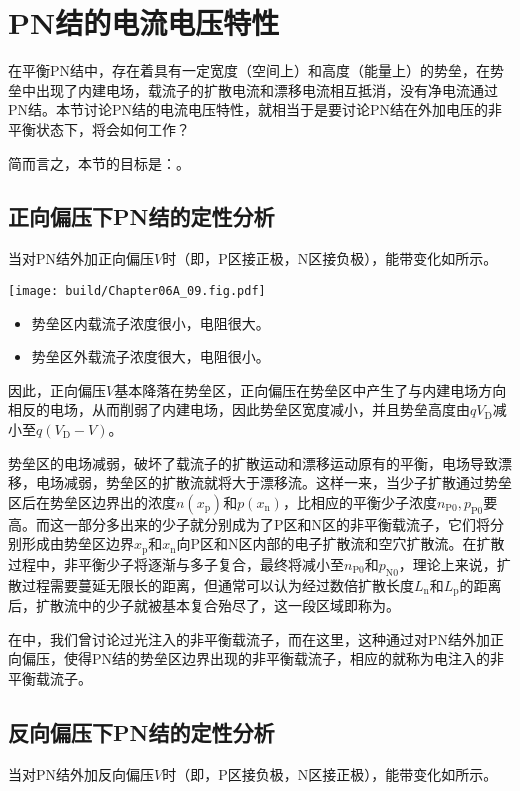 \section{PN结的电流电压特性}
在平衡PN结中，存在着具有一定宽度（空间上）和高度（能量上）的势垒，在势垒中出现了内建电场，载流子的扩散电流和漂移电流相互抵消，没有净电流通过PN结。本节讨论PN结的电流电压特性，就相当于是要讨论PN结在外加电压的非平衡状态下，将会如何工作？

简而言之，本节的目标是：。

\subsection{正向偏压下PN结的定性分析}
当对PN结外加正向偏压$V$时（即，P区接正极，N区接负极），能带变化如所示。
\begin{Figure}[正向偏压下的能带结构]
    \texttt{[image: build/Chapter06A\_09.fig.pdf]}
\end{Figure}
\begin{itemize}
    \item 势垒区内载流子浓度很小，电阻很大。
    \item 势垒区外载流子浓度很大，电阻很小。
\end{itemize}
因此，正向偏压$V$基本降落在势垒区，正向偏压在势垒区中产生了与内建电场方向相反的电场，从而削弱了内建电场，因此势垒区宽度减小，并且势垒高度由$qV_\text{D}$减小至$q(V_\text{D}-V)$。

势垒区的电场减弱，破坏了载流子的扩散运动和漂移运动原有的平衡，电场导致漂移，电场减弱，势垒区的扩散流就将大于漂移流。这样一来，当少子扩散通过势垒区后在势垒区边界出的浓度$n(x_\text{p})$和$p(x_\text{n})$，比相应的平衡少子浓度$n_\text{P0}, p_\text{P0}$要高。而这一部分多出来的少子就分别成为了P区和N区的非平衡载流子，它们将分别形成由势垒区边界$x_\text{p}$和$x_\text{n}$向P区和N区内部的电子扩散流和空穴扩散流。在扩散过程中，非平衡少子将逐渐与多子复合，最终将减小至$n_\text{P0}$和$p_\text{N0}$，理论上来说，扩散过程需要蔓延无限长的距离，但通常可以认为经过数倍扩散长度$L_\text{n}$和$L_\text{p}$的距离后，扩散流中的少子就被基本复合殆尽了，这一段区域即称为。

在中，我们曾讨论过光注入的非平衡载流子，而在这里，这种通过对PN结外加正向偏压，使得PN结的势垒区边界出现的非平衡载流子，相应的就称为电注入的非平衡载流子。

\subsection{反向偏压下PN结的定性分析}
当对PN结外加反向偏压$V$时（即，P区接负极，N区接正极），能带变化如所示。

